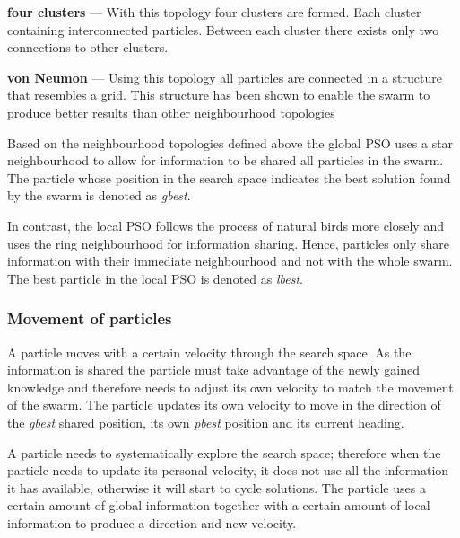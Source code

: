 \begin{description}
\item{\textbf{four clusters}} --- With this topology four clusters are formed. Each cluster containing interconnected particles\cite{FundamentalSwarm}. Between each cluster there exists only two connections to other clusters\cite{FundamentalSwarm}.
\item{\textbf{von Neumon}} --- Using this topology all particles are connected in a structure that resembles a grid\cite{FundamentalSwarm}. This structure has been shown to enable the swarm to produce better results than other neighbourhood topologies\cite{FundamentalSwarm}
\end{description}

Based on the neighbourhood topologies defined above the global \gls{PSO} uses a star neighbourhood to allow for information to be shared all particles in the swarm. The particle whose position in the search space indicates the best solution found by the swarm is denoted as \emph{gbest}\cite{SOSwarm, FundamentalSwarm, CompuIntelligenceIntro}. 

In contrast, the local \gls{PSO} follows the process of natural birds more closely and uses the ring neighbourhood for information sharing\cite{SOSwarm, FundamentalSwarm, CompuIntelligenceIntro}. Hence, particles only share information with their immediate neighbourhood and not with the whole swarm. The best particle in the local \gls{PSO} is denoted as \emph{lbest}\cite{SOSwarm, FundamentalSwarm, CompuIntelligenceIntro}.

\subsubsection{Movement of particles}
\label{sec:particleVelocity}
A particle moves with a certain velocity through the search space. As the information is shared the particle must take advantage of the newly gained knowledge and therefore needs to adjust its own velocity to match the movement of the swarm. The particle updates its own velocity to move in the direction of the \emph{gbest} shared position, its own \emph{pbest} position and its current heading.

A particle needs to systematically explore the search space; therefore when the particle needs to update its personal velocity, it does not use all the information it has available, otherwise it will start to cycle solutions. The particle uses a certain amount of global information together with a certain amount of local information to produce a direction and new velocity\cite{FundamentalSwarm,CompuIntelligenceIntro,PSOSelfHierarch,SOSwarm}. 

